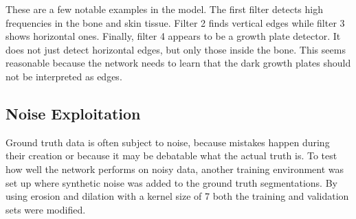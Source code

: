 These are a few notable examples in the model. The first filter detects high frequencies in the bone and skin tissue. Filter 2 finds vertical edges while filter 3 shows horizontal ones. Finally, filter 4 appears to be a growth plate detector. It does not just detect horizontal edges, but only those inside the bone. This seems reasonable because the network needs to learn that the dark growth plates should not be interpreted as edges.

\subsection{Noise Exploitation}

Ground truth data is often subject to noise, because mistakes happen during their creation or because it may be debatable what the actual truth is. To test how well the network performs on noisy data, another training environment was set up where synthetic noise was added to the ground truth segmentations. By using erosion and dilation with a kernel size of 7 both the training and validation sets were modified.


